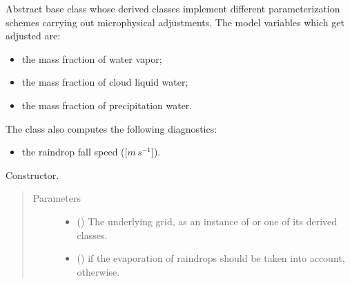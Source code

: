 \documentclass[letterpaper,10pt,english]{sphinxmanual}
\begin{document}
\begin{fulllineitems}
\label{\detokenize{api:parameterizations.adjustment_microphysics.AdjustmentMicrophysics}}
Abstract base class whose derived classes implement different parameterization schemes carrying out
microphysical adjustments. The model variables which get adjusted are:
\begin{itemize}
\item {} 
the mass fraction of water vapor;

\item {} 
the mass fraction of cloud liquid water;

\item {} 
the mass fraction of precipitation water.

\end{itemize}

The class also computes the following diagnostics:
\begin{itemize}
\item {} 
the raindrop fall speed ({[}\(m \, s^{-1}\){]}).

\end{itemize}

\begin{fulllineitems}
\label{\detokenize{api:parameterizations.adjustment_microphysics.AdjustmentMicrophysics.__init__}}
Constructor.
\begin{quote}\begin{description}
\item[{Parameters}] \leavevmode\begin{itemize}
\item {} 
 () \textendash{} The underlying grid, as an instance of {\hyperref[\detokenize{api:grids.grid_xyz.GridXYZ}]{}} or one of its derived classes.

\item {} 
 () \textendash{}  if the evaporation of raindrops should be taken into account,  otherwise.


\end{itemize}
\end{description}
\end{quote}
\end{fulllineitems}
\end{fulllineitems}
\end{document}
